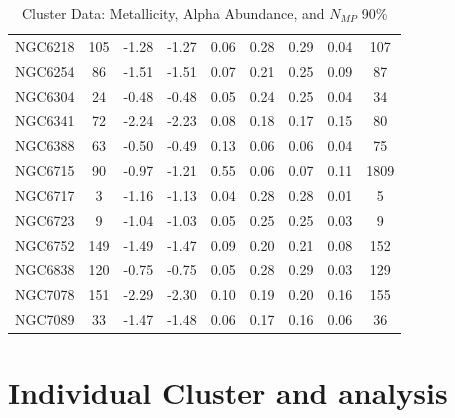 \documentclass[a4paper,12pt]{article}
\begin{document}
\begin{table}[h!]
{\begin{tabular}{|c|c|c|c|c|c|c|c|c|}
    NGC6218 & 105 & -1.28 & -1.27 & 0.06 & 0.28 & 0.29 & 0.04 &107\\
    NGC6254 & 86 & -1.51 & -1.51 & 0.07 & 0.21 & 0.25 & 0.09 &87\\
    NGC6304 & 24 & -0.48 & -0.48 & 0.05 & 0.24 & 0.25 & 0.04 &34\\
    NGC6341 & 72 & -2.24 & -2.23 & 0.08 & 0.18 & 0.17 & 0.15 &80\\
    NGC6388 & 63 & -0.50 & -0.49 & 0.13 & 0.06 & 0.06 & 0.04 &75\\
    NGC6715 & 90 & -0.97 & -1.21 & 0.55 & 0.06 & 0.07 & 0.11 &1809\\
    NGC6717 & 3 & -1.16 & -1.13 & 0.04 & 0.28 & 0.28 & 0.01 &5\\
    NGC6723 & 9 & -1.04 & -1.03 & 0.05 & 0.25 & 0.25 & 0.03 &9\\
    NGC6752 & 149 & -1.49 & -1.47 & 0.09 & 0.20 & 0.21 & 0.08 &152\\
    NGC6838 & 120 & -0.75 & -0.75 & 0.05 & 0.28 & 0.29 & 0.03 &129\\
    NGC7078 & 151 & -2.29 & -2.30 & 0.10 & 0.19 & 0.20 & 0.16 &155\\
    NGC7089 & 33 & -1.47 & -1.48 & 0.06 & 0.17 & 0.16 & 0.06 &36\\
    
    \hline
    \end{tabular}%
    }
    \caption{Cluster Data: Metallicity, Alpha Abundance, and $N_{MP}$ 90\%}
    \label{tab:cluster_data_new}
    \end{table}
    
\section{Individual Cluster  and analysis}
\end{document}
